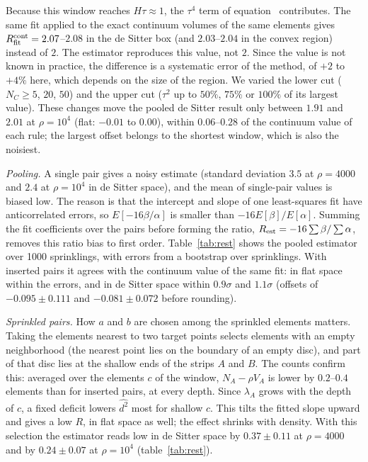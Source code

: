 \documentclass[12pt]{iopart}
\begin{document}
Because this window reaches $H\tau\approx1$, the $\tau^4$ term of equation~ contributes. The same fit applied to the exact continuum volumes of the same elements gives $R_{\rm fit}^{\rm cont}=2.07$--$2.08$ in the de Sitter box (and $2.03$--$2.04$ in the convex region) instead of $2$. The estimator reproduces this value, not $2$. Since the value is not known in practice, the difference is a systematic error of the method, of $+2$ to $+4\%$ here, which depends on the size of the region. We varied the lower cut ($N_C\geq5$, $20$, $50$) and the upper cut ($\tau^2$ up to $50\%$, $75\%$ or $100\%$ of its largest value). These changes move the pooled de Sitter result only between $1.91$ and $2.01$ at $\rho=10^4$ (flat: $-0.01$ to $0.00$), within $0.06$--$0.28$ of the continuum value of each rule; the largest offset belongs to the shortest window, which is also the noisiest.

\emph{Pooling.} A single pair gives a noisy estimate (standard deviation $3.5$ at $\rho=4000$ and $2.4$ at $\rho=10^4$ in de Sitter space), and the mean of single-pair values is biased low. The reason is that the intercept and slope of one least-squares fit have anticorrelated errors, so $E[-16\beta/\alpha]$ is smaller than $-16E[\beta]/E[\alpha]$. Summing the fit coefficients over the pairs before forming the ratio, $R_{\rm est}=-16\sum\beta/\sum\alpha$, removes this ratio bias to first order. Table~\ref{tab:rest} shows the pooled estimator over 1000 sprinklings, with errors from a bootstrap over sprinklings. With inserted pairs it agrees with the continuum value of the same fit: in flat space within the errors, and in de Sitter space within $0.9\sigma$ and $1.1\sigma$ (offsets of $-0.095\pm0.111$ and $-0.081\pm0.072$ before rounding).

\emph{Sprinkled pairs.} How $a$ and $b$ are chosen among the sprinkled elements matters. Taking the elements nearest to two target points selects elements with an empty neighborhood (the nearest point lies on the boundary of an empty disc), and part of that disc lies at the shallow ends of the strips $A$ and $B$. The counts confirm this: averaged over the elements $c$ of the window, $N_A-\rho V_A$ is lower by $0.2$--$0.4$ elements than for inserted pairs, at every depth. Since $\lambda_A$ grows with the depth of $c$, a fixed deficit lowers $\widehat{d^2}$ most for shallow $c$. This tilts the fitted slope upward and gives a low $R$, in flat space as well; the effect shrinks with density. With this selection the estimator reads low in de Sitter space by $0.37\pm0.11$ at $\rho=4000$ and by $0.24\pm0.07$ at $\rho=10^4$ (table~\ref{tab:rest}).
\end{document}
